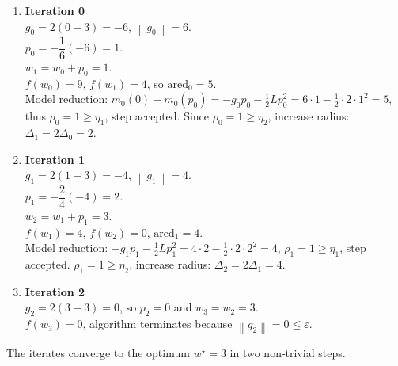 \documentclass{article}
\newcommand{\norm}[1]{\left\lVert#1\right\rVert}
\begin{document}
\begin{enumerate}[label=\textbf{Iter \arabic*:}, leftmargin=*]
\item \textbf{Iteration 0}\\
    $g_{0}=2(0-3)=-6$, $\norm{g_{0}}=6$.\\
    $p_{0}= -\dfrac{1}{6}(-6)=1$.\\
    $w_{1}=w_{0}+p_{0}=1$.\\
    $f(w_{0})=9$, $f(w_{1})=4$, so $\text{ared}_{0}=5$.\\
    Model reduction:
    $m_{0}(0)-m_{0}(p_{0})=
      -g_{0}p_{0}-\tfrac12 L p_{0}^{2}
      =6\cdot1-\tfrac12\cdot2\cdot1^{2}=5$,
    thus $\rho_{0}=1\ge\eta_{1}$, step accepted.
    Since $\rho_{0}=1\ge\eta_{2}$, increase radius:
    $\Delta_{1}=2\Delta_{0}=2$.

\item \textbf{Iteration 1}\\
    $g_{1}=2(1-3)=-4$, $\norm{g_{1}}=4$.\\
    $p_{1}= -\dfrac{2}{4}(-4)=2$.\\
    $w_{2}=w_{1}+p_{1}=3$.\\
    $f(w_{1})=4$, $f(w_{2})=0$, $\text{ared}_{1}=4$.\\
    Model reduction:
    $-g_{1}p_{1}-\tfrac12 L p_{1}^{2}=4\cdot2-\tfrac12\cdot2\cdot2^{2}=4$,
    $\rho_{1}=1\ge\eta_{1}$, step accepted.
    $\rho_{1}=1\ge\eta_{2}$, increase radius:
    $\Delta_{2}=2\Delta_{1}=4$.

\item \textbf{Iteration 2}\\
    $g_{2}=2(3-3)=0$, so $p_{2}=0$ and $w_{3}=w_{2}=3$.\\
    $f(w_{3})=0$, algorithm terminates because $\norm{g_{2}}=0\le\varepsilon$.
\end{enumerate}
The iterates converge to the optimum $w^{\star}=3$ in two non‑trivial steps.
\end{document}
